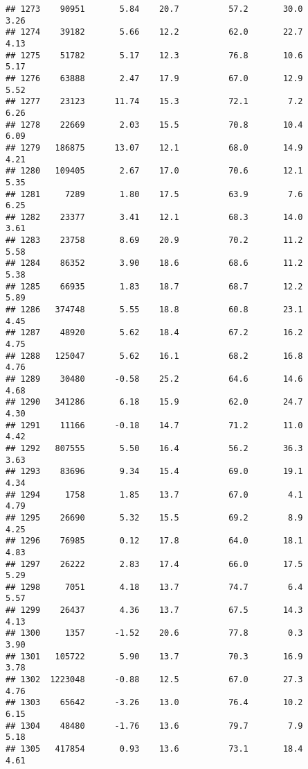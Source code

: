 \documentclass[
]{article}
\begin{document}
\begin{verbatim}
## 1273    90951       5.84    20.7          57.2       30.0              3.26
## 1274    39182       5.66    12.2          62.0       22.7              4.13
## 1275    51782       5.17    12.3          76.8       10.6              5.17
## 1276    63888       2.47    17.9          67.0       12.9              5.52
## 1277    23123      11.74    15.3          72.1        7.2              6.26
## 1278    22669       2.03    15.5          70.8       10.4              6.09
## 1279   186875      13.07    12.1          68.0       14.9              4.21
## 1280   109405       2.67    17.0          70.6       12.1              5.35
## 1281     7289       1.80    17.5          63.9        7.6              6.25
## 1282    23377       3.41    12.1          68.3       14.0              3.61
## 1283    23758       8.69    20.9          70.2       11.2              5.58
## 1284    86352       3.90    18.6          68.6       11.2              5.38
## 1285    66935       1.83    18.7          68.7       12.2              5.89
## 1286   374748       5.55    18.8          60.8       23.1              4.45
## 1287    48920       5.62    18.4          67.2       16.2              4.75
## 1288   125047       5.62    16.1          68.2       16.8              4.76
## 1289    30480      -0.58    25.2          64.6       14.6              4.68
## 1290   341286       6.18    15.9          62.0       24.7              4.30
## 1291    11166      -0.18    14.7          71.2       11.0              4.42
## 1292   807555       5.50    16.4          56.2       36.3              3.63
## 1293    83696       9.34    15.4          69.0       19.1              4.34
## 1294     1758       1.85    13.7          67.0        4.1              4.79
## 1295    26690       5.32    15.5          69.2        8.9              4.25
## 1296    76985       0.12    17.8          64.0       18.1              4.83
## 1297    26222       2.83    17.4          66.0       17.5              5.29
## 1298     7051       4.18    13.7          74.7        6.4              5.57
## 1299    26437       4.36    13.7          67.5       14.3              4.13
## 1300     1357      -1.52    20.6          77.8        0.3              3.90
## 1301   105722       5.90    13.7          70.3       16.9              3.78
## 1302  1223048      -0.88    12.5          67.0       27.3              4.76
## 1303    65642      -3.26    13.0          76.4       10.2              6.15
## 1304    48480      -1.76    13.6          79.7        7.9              5.18
## 1305   417854       0.93    13.6          73.1       18.4              4.61

\end{verbatim}
\end{document}
